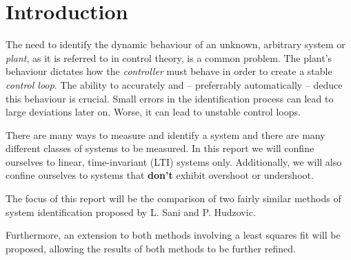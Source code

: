 \section{Introduction}

The  need  to  identify the dynamic behaviour of an unknown, arbitrary system or
\textit{plant}, as it is referred to in control theory, is a common problem. The
plant's behaviour dictates  how  the \textit{controller} must behave in order to
create  a  stable  \textit{control  loop}.  The  ability to  accurately  and  --
preferrably  automatically  -- deduce this behaviour is crucial. Small errors in
the identification process can lead to large deviations later on. Worse, it  can
lead to unstable control loops.

There  are  many  ways  to  measure  and  identify  a  system and there are many
different  classes  of systems to be measured. In this report  we  will  confine
ourselves to linear, time-invariant  (LTI)  systems  only. Additionally, we will
also  confine ourselves to systems  that  \textbf{don't}  exhibit  overshoot  or
undershoot.

The focus of this report will be the comparison of two fairly similar methods of
system   identification   proposed   by    L.    Sani\cite{ref:sani}    and   P.
Hudzovic\cite{ref:hudzovic}.

Furthermore,  an extension to both methods involving a least squares fit will be
proposed,  allowing  the  results  of   both  methods  to  be  further  refined.

